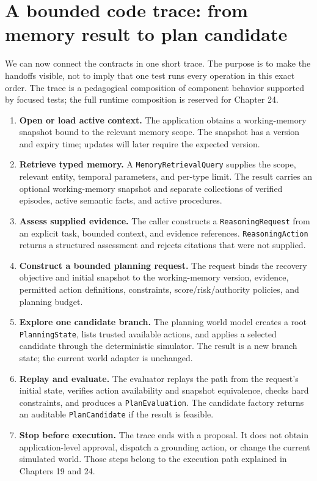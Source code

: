 \section{A bounded code trace: from memory result to plan candidate}
\label{sec:ch20-bounded-trace}

We can now connect the contracts in one short trace. The purpose is to make the handoffs visible, not to imply that one test runs every operation in this exact order. The trace is a pedagogical composition of component behavior supported by focused tests; the full runtime composition is reserved for Chapter 24.

\begin{enumerate}
  \item \textbf{Open or load active context.} The application obtains a working-memory snapshot bound to the relevant memory scope. The snapshot has a version and expiry time; updates will later require the expected version.
  \item \textbf{Retrieve typed memory.} A \texttt{MemoryRetrievalQuery} supplies the scope, relevant entity, temporal parameters, and per-type limit. The result carries an optional working-memory snapshot and separate collections of verified episodes, active semantic facts, and active procedures.
  \item \textbf{Assess supplied evidence.} The caller constructs a \texttt{ReasoningRequest} from an explicit task, bounded context, and evidence references. \texttt{ReasoningAction} returns a structured assessment and rejects citations that were not supplied.
  \item \textbf{Construct a bounded planning request.} The request binds the recovery objective and initial snapshot to the working-memory version, evidence, permitted action definitions, constraints, score/risk/authority policies, and planning budget.
  \item \textbf{Explore one candidate branch.} The planning world model creates a root \texttt{PlanningState}, lists trusted available actions, and applies a selected candidate through the deterministic simulator. The result is a new branch state; the current world adapter is unchanged.
  \item \textbf{Replay and evaluate.} The evaluator replays the path from the request's initial state, verifies action availability and snapshot equivalence, checks hard constraints, and produces a \texttt{PlanEvaluation}. The candidate factory returns an auditable \texttt{PlanCandidate} if the result is feasible.
  \item \textbf{Stop before execution.} The trace ends with a proposal. It does not obtain application-level approval, dispatch a grounding action, or change the current simulated world. Those steps belong to the execution path explained in Chapters 19 and 24.
\end{enumerate}

